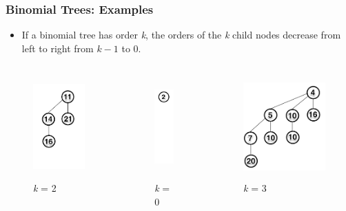 \documentclass[13pt]{beamer}
\begin{document}
\begin{frame}
\frametitle{Binomial Trees: Examples}
  \begin{itemize}
    \item If a binomial tree has order \textit{k}, the orders of the \textit{k} child nodes decrease from left to right from $k-1$ to $0$.
  \end{itemize}

  \begin{columns}[T] %
    \begin{column}[T]{3.3cm} %
      \begin{figure}
        \caption{\textit{k} = 2}
        \includegraphics[height=4cm]{./img/order2.png}
      \end{figure}
      \centering
    \end{column}
    \begin{column}[T]{3.3cm} %
      \begin{figure}
        \caption{\textit{k} = 0}
        \includegraphics[height=4cm]{./img/order0.png}
      \end{figure}
    \end{column}
    \begin{column}[T]{3.3cm} %
      \begin{figure}
        \caption{\textit{k} = 3}
        \includegraphics[height=4cm]{./img/order3.png}

\end{figure}
\end{column}
\end{columns}
\end{frame}
\end{document}
